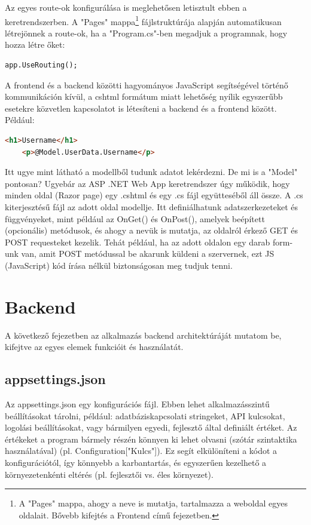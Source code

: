Az egyes route-ok konfigurálása is meglehetősen letisztult ebben a keretrendszerben. A "Pages" mappa\footnote{A "Pages" mappa, ahogy a neve is mutatja, tartalmazza a weboldal egyes oldalait. Bővebb kifejtés a Frontend című fejezetben.} fájlstruktúrája alapján automatikusan létrejönnek a route-ok, ha a "Program.cs"-ben megadjuk a programnak, hogy hozza létre őket:

\begin{lstlisting}[language={[Sharp]C}]
	app.UseRouting();
\end{lstlisting}

A frontend és a backend közötti hagyományos JavaScript segítségével történő kommunikáción kívül, a cshtml formátum miatt lehetőség nyílik egyszerűbb esetekre közvetlen kapcsolatot is létesíteni a backend és a frontend között. Például:

\begin{lstlisting}[language={HTML}]
	<h1>Username</h1>
	<p>@Model.UserData.Username</p>
\end{lstlisting}

Itt ugye mint látható a modellből tudunk adatot lekérdezni.
De mi is a "Model" pontosan? Ugyebár az ASP .NET Web App keretrendszer úgy működik, hogy minden oldal (Razor page) egy .cshtml és egy .cs fájl együtteséből áll össze. A .cs kiterjesztésű fájl az adott oldal modellje. Itt definiálhatunk adatszerkezeteket és függvényeket, mint például az OnGet() és OnPost(), amelyek beépített (opcionális) metódusok, és ahogy a nevük is mutatja,
az oldalról érkező GET és POST requesteket kezelik. Tehát például,
ha az adott oldalon egy darab form-unk van, amit POST metódussal
be akarunk küldeni a szervernek, ezt JS (JavaScript) kód írása nélkül biztonságosan meg tudjuk tenni.

\section{Backend}

A következő fejezetben az alkalmazás backend architektúráját mutatom be, kifejtve az egyes elemek funkcióit és használatát.

\subsection{appsettings.json}

Az appsettings.json egy konfigurációs
fájl. Ebben lehet alkalmazásszintű beállításokat tárolni, például:
adatbáziskapcsolati stringeket,
API kulcsokat,
logolási beállításokat,
vagy bármilyen egyedi, fejlesztő által definiált értéket.
Az értékeket a program bármely részén könnyen ki lehet olvasni (szótár szintaktika használatával)  (pl. Configuration["Kulcs"]). Ez segít elkülöníteni a kódot a
konfigurációtól, így könnyebb a karbantartás, és egyszerűen kezelhető a környezetenkénti
eltérés (pl. fejlesztői vs. éles környezet).


